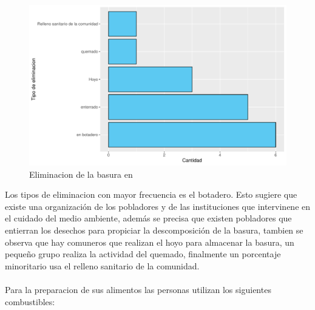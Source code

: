 \documentclass[12pt]{article}\usepackage[]{graphicx}\usepackage[]{xcolor}
\makeatletter
\def\maxwidth{ %
  \ifdim\Gin@nat@width>\linewidth
    \linewidth
  \else
    \Gin@nat@width
  \fi
}
\newenvironment{knitrout}{}{} %
\makeatother
\begin{document}
	\begin{figure}[H]
	\centering
\begin{knitrout}
\color{fgcolor}
\includegraphics[width=\maxwidth]{figure/siete-1} 
\end{knitrout}
	\caption{Eliminacion de la basura en \comunidad}
	\end{figure}
	Los tipos de eliminacion con mayor frecuencia es el botadero. Esto sugiere que existe una organización de los pobladores y de las instituciones que intervinene en el cuidado del medio ambiente, además se precisa que existen pobladores que entierran los desechos para propiciar la descomposición de la basura, tambien se observa que hay comuneros que realizan el hoyo para almacenar la basura, un pequeño grupo realiza la actividad del quemado, finalmente un porcentaje minoritario usa el relleno sanitario de la comunidad.\\
	\\
	Para la preparacion de sus alimentos las personas utilizan los siguientes combustibles:
\end{document}
